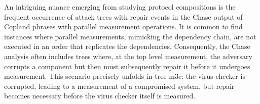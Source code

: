 \documentclass[runningheads]{llncs}
\theoremstyle{definition}
\begin{document}

An intriguing nuance emerging from studying protocol compositions is the frequent occurrence of attack trees with repair events in the Chase output of Copland phrases with parallel measurement operations. It is common to find instances where parallel measurements, mimicking the dependency chain, are not executed in an order that replicates the dependencies. Consequently, the Chase analysis often includes trees where, at the top level measurement, the adversary corrupts a component but then must subsequently repair it before it undergoes measurement. This scenario precisely unfolds in tree m3c: the virus checker is corrupted, leading to a measurement of a compromised system, but repair becomes necessary before the virus checker itself is measured.
\end{document}
